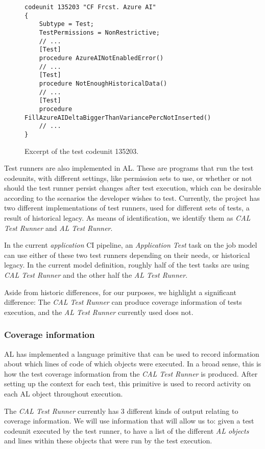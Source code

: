 \begin{figure}
    \begin{Verbatim}[fontsize=\small]
codeunit 135203 "CF Frcst. Azure AI"
{
    Subtype = Test;
    TestPermissions = NonRestrictive;
    // ...
    [Test]
    procedure AzureAINotEnabledError()
    // ...
    [Test]
    procedure NotEnoughHistoricalData()
    // ...
    [Test]
    procedure FillAzureAIDeltaBiggerThanVariancePercNotInserted()
    // ...
}
    \end{Verbatim}
    \caption{Excerpt of the test codeunit 135203.}
    \label{fig:bg-bc-test-codeunit}
\end{figure}

Test runners are also implemented in AL. These are programs that run the test codeunits, with different
settings, like permission sets to use, or whether or not should the test runner persist changes after 
test execution, which can be desirable according to the scenarios the developer wishes to test. Currently, 
the project has two different implementations of test runners, used for different
sets of tests, a result of historical legacy. As means of identification, we identify them 
as \emph{CAL Test Runner} and \emph{AL Test Runner}.

In the current \emph{application} CI pipeline, an \emph{Application Test} task on the job model can use either of these 
two test runners depending on their needs, or historical legacy. In the current model definition,
roughly half of the test tasks are using \emph{CAL Test Runner} and the other half the \emph{AL Test Runner}.

Aside from historic differences, for our purposes, we highlight a significant
difference: The \emph{CAL Test Runner} can produce coverage information of tests execution, and the \emph{AL Test Runner}
currently used does not.

\subsubsection{Coverage information}\label{s:bg-bc-coverage}
AL has implemented a language primitive that can be used to record information about which lines 
of code of which objects were executed. In a broad sense, this is how the test coverage information from 
the \emph{CAL Test Runner} is produced. After setting up the context for each test, this primitive is used
to record activity on each AL object throughout execution.

The \emph{CAL Test Runner} currently has 3 different kinds of output relating to coverage information.
We will use information that will allow us to: given a test codeunit executed by the test runner, 
to have a list of the different \emph{AL objects} and lines within these objects that were run by
the test execution.


